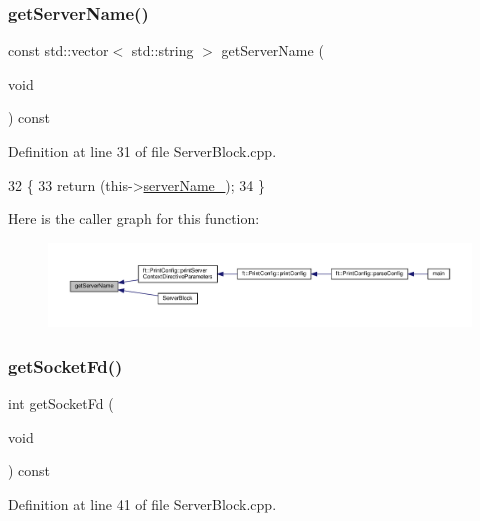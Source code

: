 \subsubsection{\texorpdfstring{get\+Server\+Name()}{getServerName()}}
{\footnotesize\ttfamily const std\+::vector$<$ std\+::string $>$ get\+Server\+Name (\begin{DoxyParamCaption}\item[{void}]{ }\end{DoxyParamCaption}) const}



Definition at line 31 of file Server\+Block.\+cpp.


\begin{DoxyCode}
32     \{
33         \textcolor{keywordflow}{return} (this->\hyperlink{classft_1_1_server_block_adc26ae834350b4c964d4198e7a431e90}{serverName\_});
34     \}
\end{DoxyCode}
Here is the caller graph for this function\+:
\nopagebreak
\begin{figure}[H]
\begin{center}
\leavevmode
\includegraphics[width=350pt]{classft_1_1_server_block_aa14d06f644ee8148fa9e2ee53d9625f9_icgraph}
\end{center}
\end{figure}
\mbox{\label{classft_1_1_server_block_ac1e0cef7ed1f4b52957f006c3fa71b03}} 
\subsubsection{\texorpdfstring{get\+Socket\+Fd()}{getSocketFd()}}
{\footnotesize\ttfamily int get\+Socket\+Fd (\begin{DoxyParamCaption}\item[{void}]{ }\end{DoxyParamCaption}) const}



Definition at line 41 of file Server\+Block.\+cpp.


